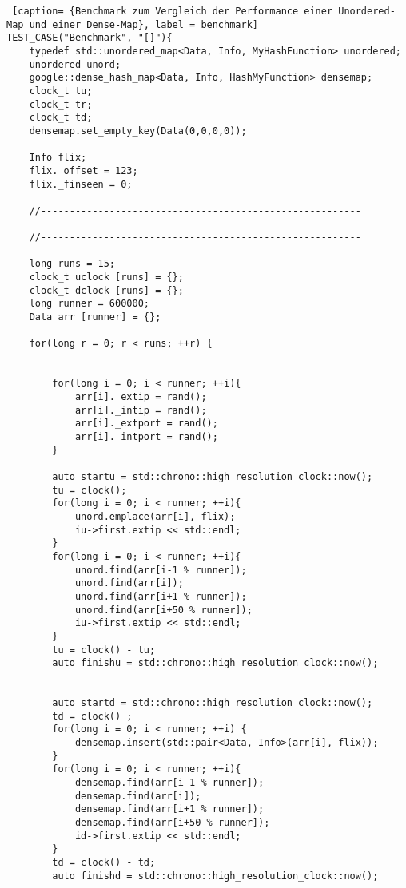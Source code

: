 \documentclass[../review_3.tex]{subfiles}
\begin{document}
\begin{lstlisting} [caption= {Benchmark zum Vergleich der Performance einer Unordered-Map und einer Dense-Map}, label = benchmark]
TEST_CASE("Benchmark", "[]"){
    typedef std::unordered_map<Data, Info, MyHashFunction> unordered;
    unordered unord;
    google::dense_hash_map<Data, Info, HashMyFunction> densemap;
    clock_t tu;
    clock_t tr;
    clock_t td;
    densemap.set_empty_key(Data(0,0,0,0));
    
    Info flix;
    flix._offset = 123;
    flix._finseen = 0;
    
    //--------------------------------------------------------
    
    //--------------------------------------------------------
    
    long runs = 15; 
    clock_t uclock [runs] = {}; 
    clock_t dclock [runs] = {}; 
    long runner = 600000; 
    Data arr [runner] = {}; 
    
    for(long r = 0; r < runs; ++r) {
        
        
        for(long i = 0; i < runner; ++i){
            arr[i]._extip = rand(); 
            arr[i]._intip = rand(); 
            arr[i]._extport = rand(); 
            arr[i]._intport = rand(); 
        }   
        
        auto startu = std::chrono::high_resolution_clock::now();
        tu = clock(); 
        for(long i = 0; i < runner; ++i){
            unord.emplace(arr[i], flix);
            iu->first.extip << std::endl; 
        }
        for(long i = 0; i < runner; ++i){
            unord.find(arr[i-1 % runner]);
            unord.find(arr[i]);
            unord.find(arr[i+1 % runner]);
            unord.find(arr[i+50 % runner]);
            iu->first.extip << std::endl; 
        }
        tu = clock() - tu; 
        auto finishu = std::chrono::high_resolution_clock::now();
        
        
        auto startd = std::chrono::high_resolution_clock::now();
        td = clock() ; 
        for(long i = 0; i < runner; ++i) {
            densemap.insert(std::pair<Data, Info>(arr[i], flix));  
        }
        for(long i = 0; i < runner; ++i){
            densemap.find(arr[i-1 % runner]);
            densemap.find(arr[i]);
            densemap.find(arr[i+1 % runner]);
            densemap.find(arr[i+50 % runner]);
            id->first.extip << std::endl; 
        }
        td = clock() - td; 
        auto finishd = std::chrono::high_resolution_clock::now();
        

\end{lstlisting}
\end{document}
